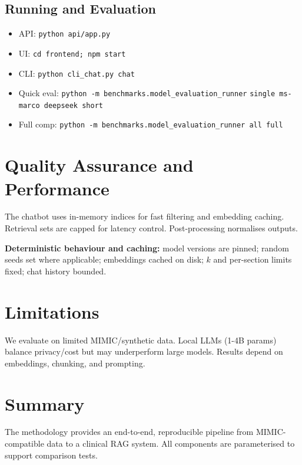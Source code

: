 \subsection{Running and Evaluation}
\begin{itemize}
  \item API: \texttt{python api/app.py}
  \item UI: \texttt{cd frontend; npm start}
  \item CLI: \texttt{python cli\_chat.py chat}
  \item Quick eval: \texttt{python -m benchmarks.model\_evaluation\_runner} \break \texttt{single ms-marco deepseek short}
  \item Full comp: \texttt{python -m benchmarks.model\_evaluation\_runner all full}
\end{itemize}

\section{Quality Assurance and Performance}
The chatbot uses in-memory indices for fast filtering and embedding caching. Retrieval sets are capped for latency control. Post-processing normalises outputs.

\noindent \textbf{Deterministic behaviour and caching:} model versions are pinned; random seeds set where applicable; embeddings cached on disk; \(k\) and per-section limits fixed; chat history bounded.

\section{Limitations}
We evaluate on limited MIMIC/synthetic data. Local LLMs (1-4B params) balance privacy/cost but may underperform large models. Results depend on embeddings, chunking, and prompting.

\section{Summary}
The methodology provides an end-to-end, reproducible pipeline from MIMIC-compatible data to a clinical RAG system. All components are parameterised to support comparison tests.
